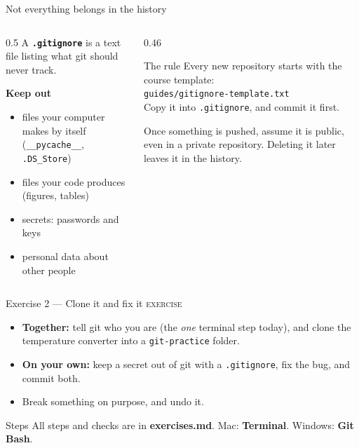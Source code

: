 \documentclass[aspectratio=169,11pt]{beamer}
\newcommand{\code}[1]{\texttt{#1}}
\newcommand{\key}[1]{\textbf{\textcolor{ban}{#1}}}
\newcommand{\exerciseframe}[3]{%
  \begin{frame}[t]{#1}
    \vspace{0.4em}
    {\small\textcolor{softgray}{\textsc{exercise}}}\par\vspace{0.6em}
    #2
    \vfill
    \begin{block}{Steps}
      All steps and checks are in \key{exercises.md}. #3
    \end{block}
    \vspace{0.6em}
  \end{frame}}
\begin{document}
\begin{frame}{Not everything belongs in the history}
  \begin{columns}[T]
    \begin{column}{0.5\textwidth}
      A \key{\code{.gitignore}} is a text file listing what git should never track.
      \vspace{0.6em}

      \textbf{Keep out}
      \begin{itemize}
        \item files your computer makes by itself\\\small(\code{\_\_pycache\_\_}, \code{.DS\_Store})
        \item files your code produces\\\small(figures, tables)
        \item \alert{secrets}: passwords and keys
        \item \alert{personal data} about other people
      \end{itemize}
    \end{column}
    \begin{column}{0.46\textwidth}
      \begin{block}{The rule}
        Every new repository starts with the course template:\\[0.3em]
        \code{guides/gitignore-template.txt}\\[0.3em]
        Copy it into \code{.gitignore}, and commit it first.
      \end{block}
      \vspace{0.4em}
      \small Once something is pushed, assume it is public, even in a private repository. Deleting it later leaves it in the history.
    \end{column}
  \end{columns}
\end{frame}

\exerciseframe{Exercise 2 --- Clone it and fix it}{%
  \begin{itemize}
    \item \textbf{Together:} tell git who you are (the \emph{one} terminal step today), and clone the temperature converter into a \code{git-practice} folder.
    \item \textbf{On your own:} keep a secret out of git with a \code{.gitignore}, fix the bug, and commit both.
    \item Break something on purpose, and undo it.
  \end{itemize}}{Mac: \textbf{Terminal}. Windows: \textbf{Git Bash}.}
\end{document}
